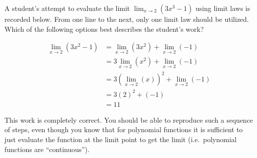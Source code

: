 \documentclass{ximera}
\author{Steven Gubkin}
\begin{document}
\begin{exercise}

	A student's attempt to evaluate the limit $\lim_{x \to 2} \left( 3x^3-1 \right)$ using limit laws is recorded below.  From one line to the next, only one limit law should be utilized.  Which of the following options best describes the student's work?
	
	\begin{align*}
		\lim_{x \to 2} \left( 3x^2-1 \right) &= \lim_{x \to 2} \left( 3x^2\right) + \lim_{x \to 2} \left( -1 \right)\\
		&= 3 \lim_{x \to 2} \left( x^2\right) + \lim_{x \to 2} \left( -1 \right)\\
		&= 3 \left( \lim_{x \to 2} \left( x\right) \right)^2 + \lim_{x \to 2} \left( -1 \right)\\
		&=3 \left( 2 \right)^2 + \left( -1 \right)\\
		&= 11
	\end{align*}
	
	\begin{multipleChoice}
	\end{multipleChoice}
	
	\begin{feedback}
	  This work is completely correct.  You should be able to
          reproduce such a sequence of steps, even though you know
          that for polynomial functions it is sufficient to just
          evaluate the function at the limit point to get the limit
          (i.e.\ polynomial functions are ``continuous'').
	\end{feedback}
	
\end{exercise}
\end{document}
